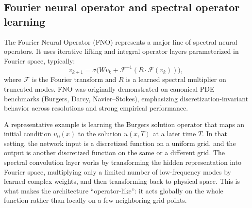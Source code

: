 \documentclass[11pt]{article}
\begin{document}
\subsection{Fourier neural operator and spectral operator learning}

The Fourier Neural Operator (FNO) represents a major line of spectral neural operators. It uses iterative lifting and integral operator layers parameterized in Fourier space, typically:
\begin{equation}
v_{k+1} = \sigma\big( W v_k + \mathcal{F}^{-1}( R \cdot \mathcal{F}(v_k) ) \big),
\end{equation}
where $\mathcal{F}$ is the Fourier transform and $R$ is a learned spectral multiplier on truncated modes. FNO was originally demonstrated on canonical PDE benchmarks (Burgers, Darcy, Navier--Stokes), emphasizing discretization-invariant behavior across resolutions and strong empirical performance.

A representative example is learning the Burgers solution operator that maps an initial condition $u_0(x)$ to the solution $u(x,T)$ at a later time $T$. In that setting, the network input is a discretized function on a uniform grid, and the output is another discretized function on the same or a different grid. The spectral convolution layer works by transforming the hidden representation into Fourier space, multiplying only a limited number of low-frequency modes by learned complex weights, and then transforming back to physical space. This is what makes the architecture ``operator-like'': it acts globally on the whole function rather than locally on a few neighboring grid points.
\end{document}
